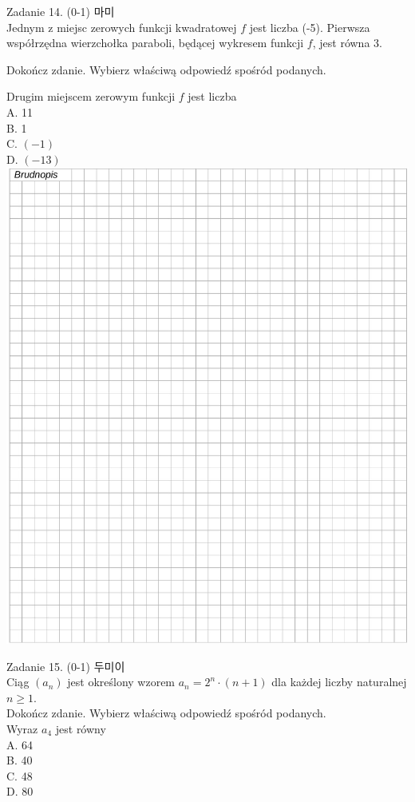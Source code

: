 \documentclass[10pt]{article}
\begin{document}
Zadanie 14. (0-1) 마미\\
Jednym z miejsc zerowych funkcji kwadratowej \(f\) jest liczba (-5). Pierwsza współrzędna wierzchołka paraboli, będącej wykresem funkcji \(f\), jest równa 3.

Dokończ zdanie. Wybierz właściwą odpowiedź spośród podanych.

Drugim miejscem zerowym funkcji \(f\) jest liczba\\
A. 11\\
B. 1\\
C. \((-1)\)\\
D. \((-13)\)\\
\includegraphics[max width=\textwidth, center]{2024_11_21_51cb67544fb9b029f01cg-14}

Zadanie 15. (0-1) 두미이\\
Ciąg \(\left(a_{n}\right)\) jest określony wzorem \(a_{n}=2^{n} \cdot(n+1)\) dla każdej liczby naturalnej \(n \geq 1\).\\
Dokończ zdanie. Wybierz właściwą odpowiedź spośród podanych.\\
Wyraz \(a_{4}\) jest równy\\
A. 64\\
B. 40\\
C. 48\\
D. 80
\end{document}
